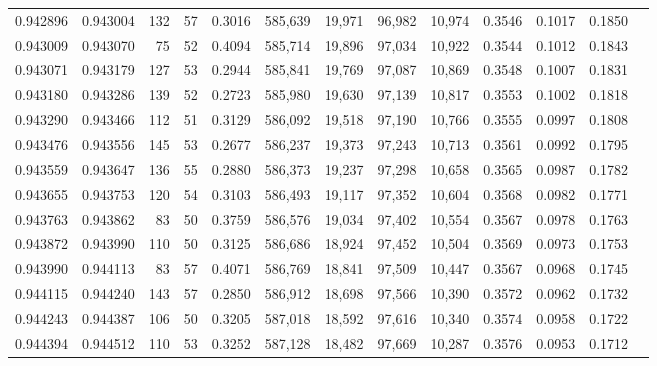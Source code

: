 \begin{tabular}{rrrrrrrrrrrrr}
0.942896 & 0.943004 &   132 &  57 &                                     0.3016 & 585,639 &  19,971 &  96,982 &  10,974 & 0.3546 & 0.1017 & 0.1850 \\
0.943009 & 0.943070 &    75 &  52 &                                     0.4094 & 585,714 &  19,896 &  97,034 &  10,922 & 0.3544 & 0.1012 & 0.1843 \\
0.943071 & 0.943179 &   127 &  53 &                                     0.2944 & 585,841 &  19,769 &  97,087 &  10,869 & 0.3548 & 0.1007 & 0.1831 \\
0.943180 & 0.943286 &   139 &  52 &                                     0.2723 & 585,980 &  19,630 &  97,139 &  10,817 & 0.3553 & 0.1002 & 0.1818 \\
0.943290 & 0.943466 &   112 &  51 &                                     0.3129 & 586,092 &  19,518 &  97,190 &  10,766 & 0.3555 & 0.0997 & 0.1808 \\
0.943476 & 0.943556 &   145 &  53 &                                     0.2677 & 586,237 &  19,373 &  97,243 &  10,713 & 0.3561 & 0.0992 & 0.1795 \\
0.943559 & 0.943647 &   136 &  55 &                                     0.2880 & 586,373 &  19,237 &  97,298 &  10,658 & 0.3565 & 0.0987 & 0.1782 \\
0.943655 & 0.943753 &   120 &  54 &                                     0.3103 & 586,493 &  19,117 &  97,352 &  10,604 & 0.3568 & 0.0982 & 0.1771 \\
0.943763 & 0.943862 &    83 &  50 &                                     0.3759 & 586,576 &  19,034 &  97,402 &  10,554 & 0.3567 & 0.0978 & 0.1763 \\
0.943872 & 0.943990 &   110 &  50 &                                     0.3125 & 586,686 &  18,924 &  97,452 &  10,504 & 0.3569 & 0.0973 & 0.1753 \\
0.943990 & 0.944113 &    83 &  57 &                                     0.4071 & 586,769 &  18,841 &  97,509 &  10,447 & 0.3567 & 0.0968 & 0.1745 \\
0.944115 & 0.944240 &   143 &  57 &                                     0.2850 & 586,912 &  18,698 &  97,566 &  10,390 & 0.3572 & 0.0962 & 0.1732 \\
0.944243 & 0.944387 &   106 &  50 &                                     0.3205 & 587,018 &  18,592 &  97,616 &  10,340 & 0.3574 & 0.0958 & 0.1722 \\
0.944394 & 0.944512 &   110 &  53 &                                     0.3252 & 587,128 &  18,482 &  97,669 &  10,287 & 0.3576 & 0.0953 & 0.1712 \\

\end{tabular}
